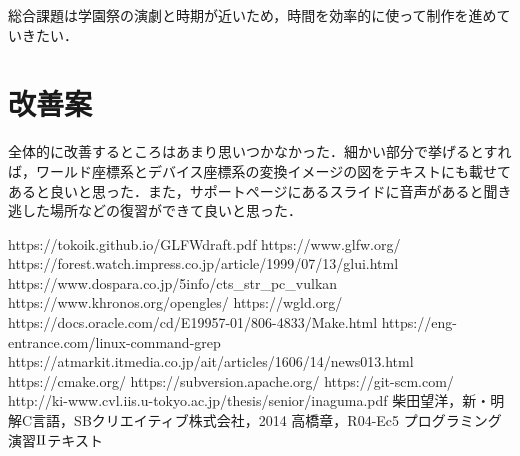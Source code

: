 \documentclass[]{jsarticle}
\begin{document}
総合課題は学園祭の演劇と時期が近いため，時間を効率的に使って制作を進めていきたい．

\section{改善案}
全体的に改善するところはあまり思いつかなかった．細かい部分で挙げるとすれば，ワールド座標系とデバイス座標系の変換イメージの図をテキストにも載せてあると良いと思った．また，サポートページにあるスライドに音声があると聞き逃した場所などの復習ができて良いと思った．

\begin{thebibliography}{99}
 https://tokoik.github.io/GLFWdraft.pdf
 https://www.glfw.org/
 https://forest.watch.impress.co.jp/article/1999/07/13/glui.html
 https://www.dospara.co.jp/5info/cts\_str\_pc\_vulkan
 https://www.khronos.org/opengles/
 https://wgld.org/
 https://docs.oracle.com/cd/E19957-01/806-4833/Make.html
 https://eng-entrance.com/linux-command-grep
 https://atmarkit.itmedia.co.jp/ait/articles/1606/14/news013.html
 https://cmake.org/
 https://subversion.apache.org/
 https://git-scm.com/
 http://ki-www.cvl.iis.u-tokyo.ac.jp/thesis/senior/inaguma.pdf
 柴田望洋，新・明解C言語，SBクリエイティブ株式会社，2014
 高橋章，R04-Ec5 プログラミング演習$\rm I\hspace{-.01em}I$テキスト
\end{thebibliography}
\end{document}
